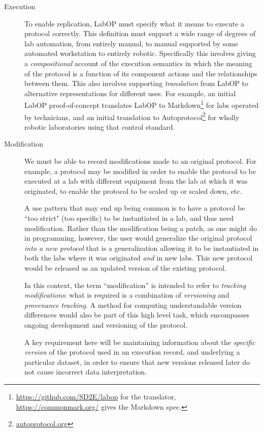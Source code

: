 \begin{description}
\item[Execution] To enable replication, LabOP must specify what it means to execute a protocol correctly.  This definition must support a wide range of degrees of lab automation, from entirely manual, to manual supported by some automated workstation to entirely robotic.  Specifically this involves giving a \emph{compositional} account of the execution semantics in which the meaning of the protocol is a function of its component actions and the relationships between them.  This also involves supporting \emph{translation} from LabOP to alternative representations for different uses.  For example, an initial LabOP proof-of-concept translates LabOP to Markdown\footnote{\url{https://github.com/SD2E/labop} for the translator, \url{https://commonmark.org/} gives the Markdown spec.} for labs operated by technicians, and an initial translation to Autoprotocol\footnote{\url{autoprotocol.org}} for wholly robotic laboratories using that control standard.

\item[Modification] We must be able to record modifications made to an original protocol. For example, a protocol may be modified in order to enable the protocol to be executed at a lab with different equipment from the lab at which it was originated, to enable the protocol to be scaled up or scaled down, etc.

A use pattern that may end up being common is to have a protocol be ``too strict" (too specific) to be instantiated in a lab, and thus need modification. Rather than the modification being a patch, as one might do in programming, however, the user would generalize the original protocol \emph{into a new protocol} that is a generalization allowing it to be instantiated in both the labs where it was originated \emph{and} in new labs.  This new protocol would be released as an updated version of the existing protocol.

In this context, the term ``modification'' is intended to refer to \emph{tracking modifications}: what is required is a combination of \emph{versioning} and \emph{provenance tracking}.  A method for computing understandable version differences would also be part of this high level task, which encompasses ongoing development and versioning of the protocol.

A key requirement here will be maintaining information about the \emph{specific version} of the protocol used in an execution record, and underlying a particular dataset, in order to ensure that new versions released later do not cause incorrect data interpretation.


\end{description}

